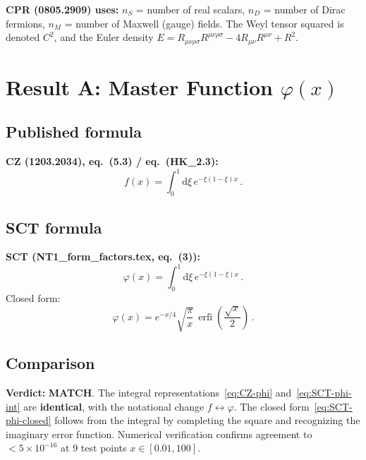 \documentclass[12pt,a4paper]{article}
\theoremstyle{definition}
\theoremstyle{remark}
\newcommand{\Rsq}{R_{\mu\nu\rho\sigma}R^{\mu\nu\rho\sigma}}
\newcommand{\Ricsq}{R_{\mu\nu}R^{\mu\nu}}
\newcommand{\dd}{\mathrm{d}}
\newcommand{\match}{\textcolor{green!60!black}{\textbf{MATCH}}}
\begin{document}
\medskip\noindent
\textbf{CPR (0805.2909) uses:}
$n_S$ = number of real scalars,
$n_D$ = number of Dirac fermions,
$n_M$ = number of Maxwell (gauge) fields.
The Weyl tensor squared is denoted $C^2$, and the Euler density
$E = \Rsq - 4\Ricsq + R^2$.


\section{Result A: Master Function $\varphi(x)$}
\label{sec:phi}

\subsection{Published formula}

\noindent\textbf{CZ (1203.2034), eq.~(5.3) / eq.~(HK\_2.3):}
\begin{equation}
  f(x) = \int_0^1 \dd\xi\, e^{-\xi(1-\xi)x}\,.
  \label{eq:CZ-phi}
\end{equation}

\subsection{SCT formula}

\noindent\textbf{SCT (NT1\_form\_factors.tex, eq.~(3)):}
\begin{equation}
  \varphi(x) = \int_0^1 \dd\xi\, e^{-\xi(1-\xi)x}\,.
  \label{eq:SCT-phi-int}
\end{equation}
Closed form:
\begin{equation}
  \varphi(x) = e^{-x/4}\sqrt{\frac{\pi}{x}}\,\operatorname{erfi}\!\left(\frac{\sqrt{x}}{2}\right)\,.
  \label{eq:SCT-phi-closed}
\end{equation}

\subsection{Comparison}

\textbf{Verdict:} \match. The integral representations~\eqref{eq:CZ-phi}
and~\eqref{eq:SCT-phi-int} are \textbf{identical}, with the notational change
$f \leftrightarrow \varphi$.  The closed form~\eqref{eq:SCT-phi-closed}
follows from the integral by completing the square and recognizing the
imaginary error function.  Numerical verification confirms agreement to
$< 5 \times 10^{-16}$ at 9 test points $x \in [0.01, 100]$.
\end{document}
